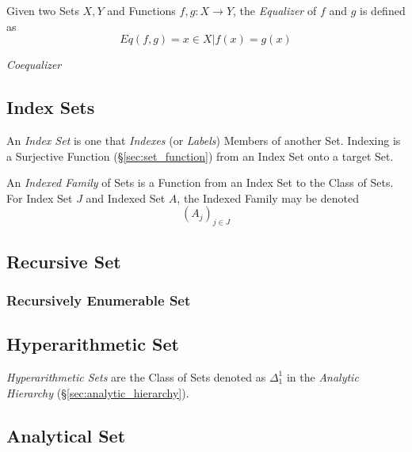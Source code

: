 Given two Sets $X,Y$ and Functions $f,g : X \rightarrow Y$, the
\emph{Equalizer} of $f$ and $g$ is defined as
\[
    Eq(f,g) = { x \in X | f(x) = g(x) }
\]

\emph{Coequalizer}



\subsection{Index Sets}\label{sec:index_set}

An \emph{Index Set} is one that \emph{Indexes} (or \emph{Labels})
Members of another Set. Indexing is a Surjective Function
(\S\ref{sec:set_function}) from an Index Set onto a target Set.

An \emph{Indexed Family} of Sets is a Function from an Index Set to
the Class of Sets. For Index Set $J$ and Indexed Set $A$, the Indexed
Family may be denoted
\[
    (A_j)_{j \in J}
\]



\subsection{Recursive Set}\label{sec:recursive_set}

\subsubsection{Recursively Enumerable Set}\label{sec:recursively_enumerable}

\subsection{Hyperarithmetic Set}\label{sec:hyperarithmetic_set}

\emph{Hyperarithmetic Sets} are the Class of Sets denoted as
$\Delta^1_1$ in the \emph{Analytic Hierarchy}
(\S\ref{sec:analytic_hierarchy}).



\subsection{Analytical Set}\label{sec:analytical_set}



